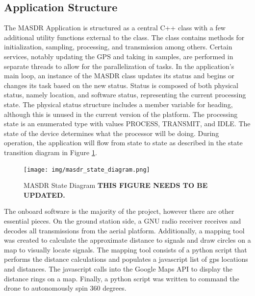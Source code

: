 \subsection{Application Structure}
The MASDR Application is structured as a central C++ class with a few additional utility functions external to the class. The class contains methods for initialization, sampling, processing, and transmission among others. Certain services, notably updating the GPS and taking in samples, are performed in separate threads to allow for the parallelization of tasks. In the application’s main loop, an instance of the MASDR class updates its status and begins or changes its task based on the new status. Status is composed of both physical status, namely location, and software status, representing the current processing state. The physical status structure includes a member variable for heading, although this is unused in the current version of the platform. The processing state is an enumerated type with values PROCESS, TRANSMIT, and IDLE. The state of the device determines what the processor will be doing. During operation, the application will flow from state to state as described in the state transition diagram in Figure \ref{fig:state_diagram}. \par
\begin{figure}[ht]
\centering
\texttt{[image: img/masdr\_state\_diagram.png]}
\caption{MASDR State Diagram \textbf{THIS FIGURE NEEDS TO BE UPDATED.}}
\label{fig:state_diagram}
\end{figure}
The onboard software is the majority of the project, however there are other essential pieces. On the ground station side, a GNU radio receiver receives and decodes all transmissions from the aerial platform. Additionally, a mapping tool was created to calculate the approximate distance to signals and draw circles on a map to visually locate signals. The mapping tool consists of a python script that performs the distance calculations and populates a javascript list of gps locations and distances. The javascript calls into the Google Maps API to display the distance rings on a map. Finally, a python script was written to command the drone to autonomously spin 360 degrees.
